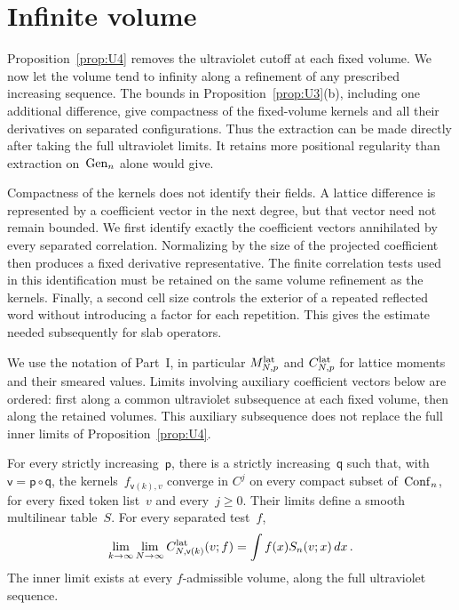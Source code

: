 \section{Infinite volume}\label{sec:partII-F}

Proposition~\ref{prop:U4} removes the ultraviolet cutoff at each fixed volume. We now let the volume tend to infinity along a refinement of any prescribed increasing sequence. The bounds in Proposition~\ref{prop:U3}(b), including one additional difference, give compactness of the fixed-volume kernels and all their derivatives on separated configurations. Thus the extraction can be made directly after taking the full ultraviolet limits. It retains more positional regularity than extraction on~$\mathrm{Gen}_{n}$ alone would give.

Compactness of the kernels does not identify their fields. A lattice difference is represented by a coefficient vector in the next degree, but that vector need not remain bounded. We first identify exactly the coefficient vectors annihilated by every separated correlation. Normalizing by the size of the projected coefficient then produces a fixed derivative representative. The finite correlation tests used in this identification must be retained on the same volume refinement as the kernels. Finally, a second cell size controls the exterior of a repeated reflected word without introducing a factor for each repetition. This gives the estimate needed subsequently for slab operators.

We use the notation of Part~I, in particular $M^{\mathrm{lat}}_{N,p}$ and $C^{\mathrm{lat}}_{N,p}$ for lattice moments and their smeared values. Limits involving auxiliary coefficient vectors below are ordered: first along a common ultraviolet subsequence at each fixed volume, then along the retained volumes. This auxiliary subsequence does not replace the full inner limits of Proposition~\ref{prop:U4}.

\begin{lemma}\label{lem:F-compactness}
For every strictly increasing~$\mathsf p$, there is a strictly increasing~$\mathsf q$ such that, with $\mathsf v=\mathsf p\circ\mathsf q$, the kernels~$f_{\mathsf v(k),v}$ converge in $C^j$ on every compact subset of~$\mathrm{Conf}_{n}$, for every fixed token list~$v$ and every~$j\ge0$. Their limits define a smooth multilinear table~$S$. For every separated test~$f$,
\begin{equation}\label{eq:F-ordered}
\lim_{k\to\infty}\lim_{N\to\infty}C^{\mathrm{lat}}_{N,\mathsf v(k)}(v;f)=\int f(x)S_n(v;x)\,dx\,.
\end{equation}
The inner limit exists at every $f$-admissible volume, along the full ultraviolet sequence.
\end{lemma}

